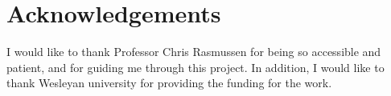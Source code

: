 \documentclass[12pt, letterpaper]{article}
\theoremstyle{definition}
\begin{document}
\section{Acknowledgements}I would like to thank Professor Chris Rasmussen for being so accessible and patient, and for guiding me through this project. In addition, I would like to thank Wesleyan university for providing the funding for the work.
\end{document}
